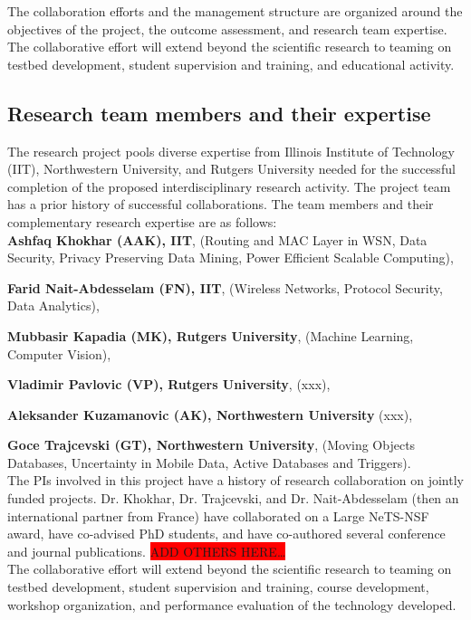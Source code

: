 
The collaboration efforts and the management structure are organized around the objectives of the project, the outcome assessment, and research team expertise. The collaborative effort will extend beyond the scientific research to teaming on testbed development, student supervision and training, and educational activity.

\subsection{Research team members and their expertise}
The research project pools diverse expertise from Illinois Institute of Technology (IIT), Northwestern University, and Rutgers University needed for the successful completion of the proposed interdisciplinary research activity. The project team has a prior history of successful collaborations. The team members and their complementary research expertise are as follows:\\

\textbf{Ashfaq Khokhar (AAK), IIT}, (Routing and MAC Layer in WSN, Data Security, Privacy Preserving Data Mining, Power Efficient Scalable Computing),  

\textbf{Farid Nait-Abdesselam (FN), IIT}, (Wireless Networks, Protocol Security, Data Analytics), 

\textbf{Mubbasir Kapadia (MK), Rutgers University}, (Machine Learning, Computer Vision), 

\textbf{Vladimir Pavlovic (VP), Rutgers University}, (xxx), 

\textbf{Aleksander Kuzamanovic (AK), Northwestern University} (xxx),

\textbf{Goce Trajcevski (GT), Northwestern University}, (Moving Objects Databases, Uncertainty in Mobile Data, Active Databases and Triggers). \\

The PIs involved in this project have a history of research collaboration on jointly funded projects. Dr. Khokhar, Dr. Trajcevski, and Dr. Nait-Abdesselam (then an international partner from France) have collaborated on a Large NeTS-NSF award, have co-advised PhD students, and have co-authored several conference and journal publications. 
\colorbox{red}{ADD OTHERS HERE…}\\
The collaborative effort will extend beyond the scientific research to teaming on testbed development, student supervision and training, course development, workshop organization, and performance evaluation of the technology developed.


